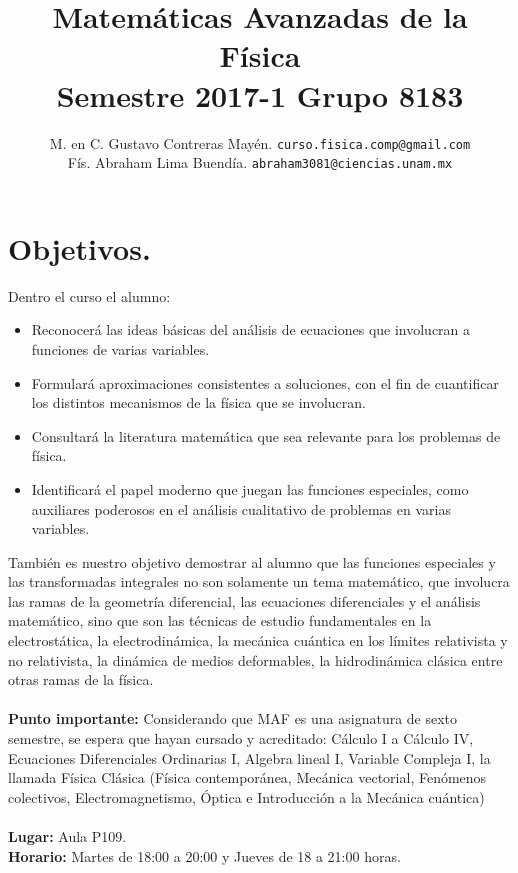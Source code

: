 \documentclass[12pt]{article}
\author{M. en C. Gustavo Contreras Mayén. \texttt{curso.fisica.comp@gmail.com}\\
Fís. Abraham Lima Buendía. \texttt{abraham3081@ciencias.unam.mx}}
\title{Matemáticas Avanzadas de la Física \\ {\large Semestre 2017-1 Grupo 8183}}
\date{ }
\begin{document}
\vspace{-4cm}
\renewcommand\labelenumii{\theenumi.{\arabic{enumii}}}
\maketitle
\fontsize{14}{14}\selectfont
\section{Objetivos.}
Dentro el curso el alumno:
\begin{itemize}
\setlength{\itemsep}{0mm}
\item Reconocerá las ideas básicas del análisis de ecuaciones que involucran a funciones de varias variables.
\item Formulará aproximaciones consistentes a soluciones, con el fin de cuantificar los distintos mecanismos de la física que se involucran.
\item Consultará la literatura matemática que sea relevante para los problemas de física.
\item Identificará el papel moderno que juegan las funciones especiales, como auxiliares poderosos en el análisis cualitativo de problemas en varias variables.
\end{itemize}
También es nuestro objetivo demostrar al alumno que las funciones especiales y las transformadas integrales no son solamente un tema matemático, que involucra las ramas de la geometría diferencial, las ecuaciones diferenciales y el análisis matemático, sino que son las técnicas de estudio fundamentales en la electrostática, la electrodinámica, la mecánica cuántica en los límites relativista y  no relativista, la dinámica de medios deformables, la hidrodinámica clásica entre otras ramas de la física.
\\
\\
\textbf{Punto importante: } Considerando que MAF es una asignatura de sexto semestre, se espera que hayan cursado y acreditado: Cálculo I a Cálculo IV, Ecuaciones Diferenciales Ordinarias I, Algebra lineal I, Variable Compleja I, la llamada Física Clásica (Física contemporánea, Mecánica vectorial, Fenómenos colectivos, Electromagnetismo, Óptica e Introducción a la Mecánica cuántica)
\\
\\
\textbf{Lugar: }Aula P109.
\\
\textbf{Horario: } Martes de 18:00 a 20:00 y Jueves de 18 a 21:00 horas.
\end{document}
